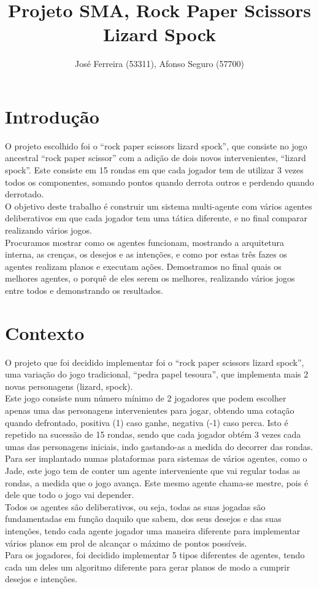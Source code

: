 \documentclass[12pt]{article}
\title{Projeto SMA, Rock Paper Scissors Lizard Spock}
\author{José Ferreira (53311), Afonso Seguro (57700)}
\begin{document}
	
	\maketitle
	
	\section*{Introdução}
	O projeto escolhido foi o “rock paper scissors lizard spock”, que consiste no jogo ancestral “rock paper scissor” com a adição de dois novos intervenientes, “lizard spock”. Este consiste em 15 rondas em que cada jogador tem de utilizar 3 vezes todos os componentes, somando pontos quando derrota outros e perdendo quando derrotado.\\
    O objetivo deste trabalho é construir um sistema multi-agente com vários agentes deliberativos em que cada jogador tem uma tática diferente, e no final comparar realizando vários jogos.\\
    Procuramos mostrar como os agentes funcionam, mostrando a arquitetura interna, as crenças, os desejos e as intenções, e como por estas três fazes os agentes realizam planos e executam ações.
    Demostramos no final quais os melhores agentes, o porquê de eles serem os melhores, realizando vários jogos entre todos e demonstrando os resultados.\\

	
	\section*{Contexto}
	O projeto que foi decidido implementar foi o “rock paper scissors lizard spock”, uma variação do jogo tradicional, “pedra papel tesoura”, que implementa mais 2 novas personagens (lizard, spock).\\
    Este jogo consiste num número mínimo de 2 jogadores que podem escolher apenas uma das personagens intervenientes para jogar, obtendo uma cotação quando defrontado, positiva (1) caso ganhe, negativa (-1) caso perca. Isto é repetido na sucessão de 15 rondas, sendo que cada jogador obtém 3 vezes cada umas das personagens iniciais, indo gastando-as a medida do decorrer das rondas.\\
    Para ser implantado numas plataformas para sistemas de vários agentes, como o Jade, este jogo tem de conter um agente interveniente que vai regular todas as rondas, a medida que o jogo avança. Este mesmo agente chama-se mestre, pois é dele que todo o jogo vai depender.\\
    Todos os agentes são deliberativos, ou seja, todas as suas jogadas são fundamentadas em função daquilo que sabem, dos seus desejos e das suas intenções, tendo cada agente jogador uma maneira diferente para implementar vários planos em prol de alcançar o máximo de pontos possíveis.\\
    Para os jogadores, foi decidido implementar 5 tipos diferentes de agentes, tendo cada um deles um algoritmo diferente para gerar planos de modo a cumprir desejos e intenções.\\
    
\end{document}
